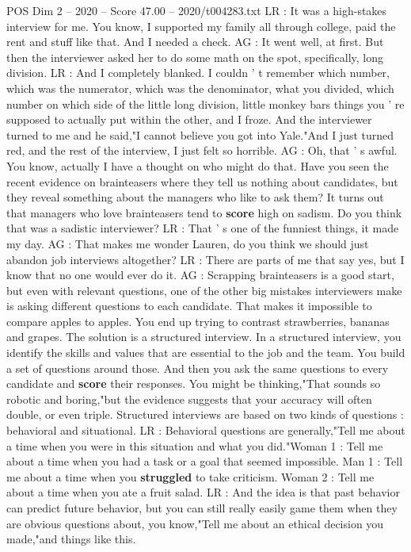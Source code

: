 \begin{textsample}{POS Dim 2 – 2020 – Score 47.00 – 2020/t004283.txt}
LR : It was a high-stakes interview for me.
You know, I supported my family all through college, paid the rent and stuff like that.
And I needed a check.
AG : It went well, at first.
But then the interviewer asked her to do some math on the spot, specifically, long division.
LR : And I completely blanked.
I couldn ' t remember which number, which was the numerator, which was the denominator, what you divided, which number on which side of the little long division, little monkey bars things you ' re supposed to actually put within the other, and I froze.
And the interviewer turned to me and he said,"I cannot believe you got into Yale."And I just turned red, and the rest of the interview, I just felt so horrible.
AG : Oh, that ' s awful.
You know, actually I have a thought on who might do that.
Have you seen the recent evidence on brainteasers where they tell us nothing about candidates, but they reveal something about the managers who like to ask them?
It turns out that managers who love brainteasers tend to \textbf{score} high on sadism.
Do you think that was a sadistic interviewer?
LR : That ' s one of the funniest things, it made my day.
AG : That makes me wonder Lauren, do you think we should just abandon job interviews altogether?
LR : There are parts of me that say yes, but I know that no one would ever do it.
AG : Scrapping brainteasers is a good start, but even with relevant questions, one of the other big mistakes interviewers make is asking different questions to each candidate.
That makes it impossible to compare apples to apples.
You end up trying to contrast strawberries, bananas and grapes.
The solution is a structured interview.
In a structured interview, you identify the skills and values that are essential to the job and the team.
You build a set of questions around those.
And then you ask the same questions to every candidate and \textbf{score} their responses.
You might be thinking,"That sounds so robotic and boring,"but the evidence suggests that your accuracy will often double, or even triple.
Structured interviews are based on two kinds of questions : behavioral and situational.
LR : Behavioral questions are generally,"Tell me about a time when you were in this situation and what you did."Woman 1 : Tell me about a time when you had a task or a goal that seemed impossible.
Man 1 : Tell me about a time when you \textbf{struggled} to take criticism.
Woman 2 : Tell me about a time when you ate a fruit salad.
LR : And the idea is that past behavior can predict future behavior, but you can still really easily game them when they are obvious questions about, you know,"Tell me about an ethical decision you made,"and things like this.

\end{textsample}
